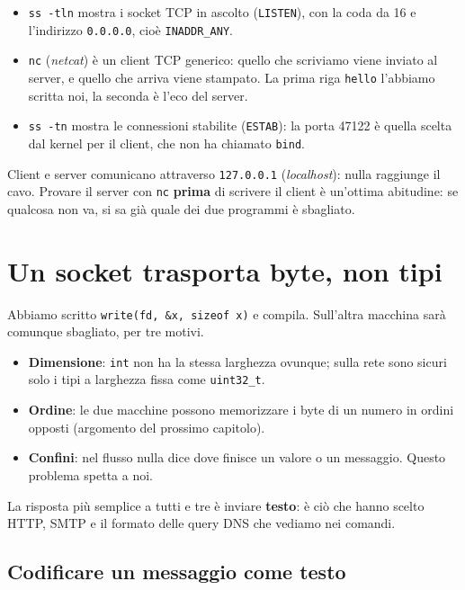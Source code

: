 \begin{itemize}
    \item \texttt{ss -tln} mostra i socket TCP in ascolto (\texttt{LISTEN}), con la coda da 16 e l'indirizzo
          \texttt{0.0.0.0}, cioè \texttt{INADDR\_ANY}.
    \item \texttt{nc} (\emph{netcat}) è un client TCP generico: quello che scriviamo viene inviato al server, e quello che
          arriva viene stampato. La prima riga \texttt{hello} l'abbiamo scritta noi, la seconda è l'eco del server.
    \item \texttt{ss -tn} mostra le connessioni stabilite (\texttt{ESTAB}): la porta 47122 è quella scelta dal kernel per
          il client, che non ha chiamato \texttt{bind}.
\end{itemize}

Client e server comunicano attraverso \texttt{127.0.0.1} (\emph{localhost}): nulla raggiunge il cavo. Provare il
server con \texttt{nc} \textbf{prima} di scrivere il client è un'ottima abitudine: se qualcosa non va, si sa già quale dei
due programmi è sbagliato.

\section{Un socket trasporta byte, non tipi}

Abbiamo scritto \texttt{write(fd, \&x, sizeof x)} e compila. Sull'altra macchina sarà comunque sbagliato, per tre motivi.
\begin{itemize}
    \item \textbf{Dimensione}: \texttt{int} non ha la stessa larghezza ovunque; sulla rete sono sicuri solo i tipi a
          larghezza fissa come \texttt{uint32\_t}.
    \item \textbf{Ordine}: le due macchine possono memorizzare i byte di un numero in ordini opposti (argomento del
          prossimo capitolo).
    \item \textbf{Confini}: nel flusso nulla dice dove finisce un valore o un messaggio. Questo problema spetta a noi.
\end{itemize}

La risposta più semplice a tutti e tre è inviare \textbf{testo}: è ciò che hanno scelto HTTP, SMTP e il formato delle
query DNS che vediamo nei comandi.

\subsection{Codificare un messaggio come testo}

